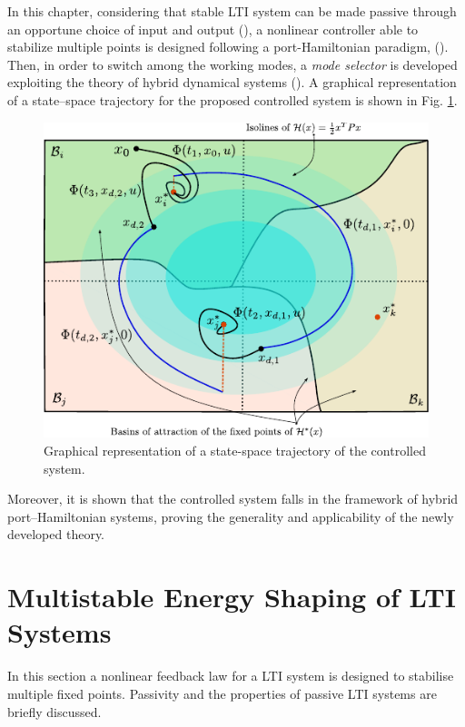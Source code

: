 %
In this chapter, considering that stable LTI system can be made passive through an opportune choice of input and output (\cite{byrnes91}), a nonlinear controller able to stabilize multiple points is designed following a port-Hamiltonian paradigm, (\cite{876703,secchi2007control,ortega2008control,van2014port}). Then, in order to switch among the working modes, a \textit{mode selector} is developed exploiting the theory of hybrid dynamical systems (\cite{van2000introduction,goebel2008}). A graphical representation of a state--space trajectory for the proposed controlled system is shown in Fig. \ref{fig:mesh_graph}.
%
\begin{figure}[!ht]
    \centering
    \includegraphics{Drawings/draw.pdf}
    \caption{Graphical representation of a state-space trajectory of the controlled system.}
    \label{fig:mesh_graph}
\end{figure}
%
\newline

%
Moreover, it is shown that the controlled system falls in the framework of hybrid port--Hamiltonian systems, proving the generality and applicability of the newly developed theory.
%

\clearpage

\section{Multistable Energy Shaping of LTI Systems}\label{sec:multistable}
%
In this section a nonlinear feedback law for a LTI system is designed to stabilise multiple fixed points. Passivity and the properties of passive LTI systems are briefly discussed.
